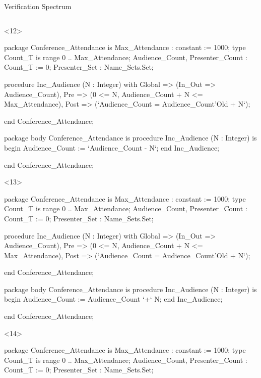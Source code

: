 \documentclass{beamer}
\begin{document}
\begin{frame}[fragile]{Verification Spectrum}
\begin{columns}
\begin{column}{9cm}
      \begin{onlyenv}<12>
      \begin{pxcode}[language=SPARK,style=magic,gobble=8]
        package Conference_Attendance
        is
           Max_Attendance : constant := 1000;
           type Count_T is range 0 .. Max_Attendance;
           Audience_Count, Presenter_Count : Count_T := 0;
           Presenter_Set : Name_Sets.Set;

           procedure Inc_Audience (N : Integer)
           with Global => (In_Out => Audience_Count),
                Pre    => (0 <= N, Audience_Count + N <= Max_Attendance),
                Post   => (`Audience_Count = Audience_Count'Old + N`);

        end Conference_Attendance;

        package body Conference_Attendance
        is
           procedure Inc_Audience (N : Integer)
           is
           begin
              Audience_Count := `Audience_Count - N`;
           end Inc_Audience;

        end Conference_Attendance;
      \end{pxcode}
      \end{onlyenv}

      \begin{onlyenv}<13>
      \begin{pxcode}[language=SPARK,style=magic,gobble=8]
        package Conference_Attendance
        is
           Max_Attendance : constant := 1000;
           type Count_T is range 0 .. Max_Attendance;
           Audience_Count, Presenter_Count : Count_T := 0;
           Presenter_Set : Name_Sets.Set;

           procedure Inc_Audience (N : Integer)
           with Global => (In_Out => Audience_Count),
                Pre    => (0 <= N, Audience_Count + N <= Max_Attendance),
                Post   => (`Audience_Count = Audience_Count'Old + N`);

        end Conference_Attendance;

        package body Conference_Attendance
        is
           procedure Inc_Audience (N : Integer)
           is
           begin
              Audience_Count := Audience_Count `+` N;
           end Inc_Audience;

        end Conference_Attendance;
      \end{pxcode}
      \end{onlyenv}

      \begin{onlyenv}<14>
      \begin{pxcode}[language=SPARK,style=magic,gobble=8]
        package Conference_Attendance
        is
           Max_Attendance : constant := 1000;
           type Count_T is range 0 .. Max_Attendance;
           Audience_Count, Presenter_Count : Count_T := 0;
           Presenter_Set : Name_Sets.Set;


\end{pxcode}
\end{onlyenv}
\end{column}
\end{columns}
\end{frame}
\end{document}
